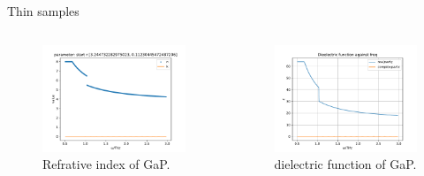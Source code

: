 \documentclass[aspectratio=1610, 9pt]{beamer}
\begin{document}
\begin{frame}{Thin samples}
  \begin{center}
    \begin{columns}
      \begin{column}{0.5\textwidth}
        \begin{figure}
        \includegraphics[width=\textwidth]{images/GAP/frequncy_against_n_k.pdf}
        \caption{Refrative index of GaP.}
        \end{figure}
      \end{column}
      \begin{column}{0.5\textwidth}
        \begin{figure}
        \includegraphics[width=\textwidth]{images/GAP/epsilon.pdf}
        \caption{dielectric function of GaP.}
        \end{figure}
      \end{column}
    \end{columns}
  \end{center}
\end{frame}
\end{document}
